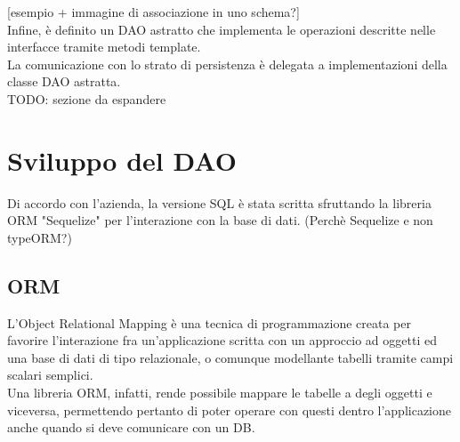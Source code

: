 \documentclass[a4paper, 12pt]{scrartcl}
\begin{document}
      [esempio + immagine di associazione in uno schema?]\\

      Infine, è definito un DAO astratto che implementa le operazioni descritte nelle interfacce tramite metodi template.\\
      La comunicazione con lo strato di persistenza è delegata a implementazioni della classe DAO astratta.\\
      TODO: sezione da espandere
    
      




  \newpage
  \section*{Sviluppo del DAO}
    Di accordo con l'azienda, la versione SQL è stata scritta sfruttando la libreria ORM "Sequelize" per l'interazione con la base di dati. (Perchè Sequelize e non typeORM?)
    
    \subsection*{ORM}
      L'Object Relational Mapping è una tecnica di programmazione creata per favorire l'interazione fra un'applicazione scritta con un approccio ad oggetti ed una base di dati di tipo relazionale, o comunque modellante tabelli tramite campi scalari semplici.\\
        Una libreria ORM, infatti, rende possibile mappare le tabelle a degli oggetti e viceversa, permettendo pertanto di poter operare con questi dentro l'applicazione anche quando si deve comunicare con un DB.\\
\end{document}

